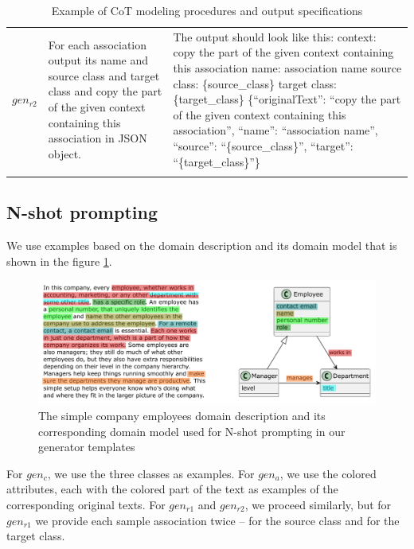 \begin{table}[!h]
\begin{tabular}{@{}l>{\raggedright\arraybackslash}p{}>{\raggedright\arraybackslash}p{}@{}}
$gen_{r2}$ & For each association output its name and source class and target class and copy the part of the given context containing this association in JSON object. &
The output should look like this: \newline
context: copy the part of the given context containing this association \newline
name: association name \newline
source class: \{source\_class\} \newline
target class: \{target\_class\} \newline
\{``originalText'': ``copy the part of the given context containing this association'', ``name'': ``association name'', ``source'': ``\{source\_class\}'', ``target'': ``\{target\_class\}''\} \\

	\addlinespace
	\bottomrule
	\addlinespace
	\end{tabular}
	\caption{Example of CoT modeling procedures and output specifications}
	\label{tab:cot-prompt-templates}
\end{table}


\subsection{N-shot prompting}

We use examples based on the domain description and its domain model that is shown in the figure \ref{fig:prompting-domain}.

\begin{figure}[!h]
    \centering
    \includegraphics[scale=0.6]{img/prompting-domain.pdf}
    \caption{\centering The simple company employees domain description and its corresponding domain model used for N-shot prompting in our generator templates}
    \label{fig:prompting-domain}
\end{figure}


For $gen_c$, we use the three classes as examples. For $gen_a$, we use the colored attributes, each with the colored part of the text as examples of the corresponding original texts. For $gen_{r1}$ and ${gen_{r2}}$, we proceed similarly, but for ${gen_{r1}}$ we provide each sample association twice – for the source class and for the target class.

